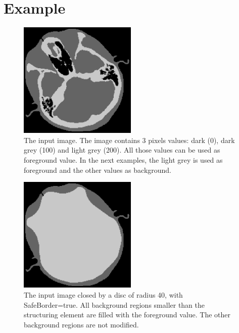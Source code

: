\documentclass[IJ]{cesj}
\begin{document}
\section{Example}

\begin{figure}[b]
\centering
\includegraphics[width=0.5\textwidth]{2th_cthead1.eps}
\caption{The input image. The image contains 3 pixels values: dark (0), dark grey (100) and light grey (200). All those values can be used as foreground value. In the next examples, the light grey is used as foreground and the other values as background.}
\end{figure}

\begin{figure}
\centering
\includegraphics[width=0.5\textwidth]{close.eps}
\caption{The input image closed by a disc of radius 40, with SafeBorder=true. All background regions smaller than the structuring element are filled with the foreground value. The other background regions are not modified.}
\end{figure}
\end{document}
